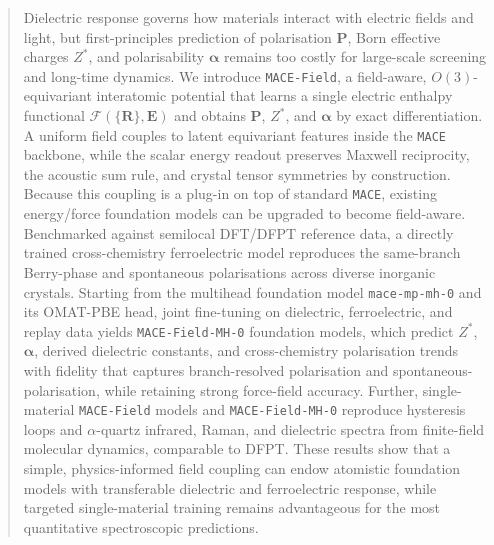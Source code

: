 \documentclass[aps,physrev,graphicx,amsmath,amssymb,
               reprint,superscriptaddress]{revtex4-2}
\begin{document}
\begin{abstract}
Dielectric response governs how materials interact with electric fields and light, but first-principles prediction of polarisation $\mathbf P$, Born effective charges $Z^*$, and polarisability $\boldsymbol\alpha$ remains too costly for large-scale screening and long-time dynamics. We introduce \texttt{MACE-Field}, a field-aware, $O(3)$-equivariant interatomic potential that learns a single electric enthalpy functional $\mathcal F(\{\mathbf R\},\mathbf E)$ and obtains $\mathbf P$, $Z^*$, and $\boldsymbol\alpha$ by exact differentiation. A uniform field couples to latent equivariant features inside the \texttt{MACE} backbone, while the scalar energy readout preserves Maxwell reciprocity, the acoustic sum rule, and crystal tensor symmetries by construction. Because this coupling is a plug-in on top of standard \texttt{MACE}, existing energy/force foundation models can be upgraded to become field-aware. Benchmarked against semilocal DFT/DFPT reference data, a directly trained cross-chemistry ferroelectric model reproduces the same-branch Berry-phase and spontaneous polarisations across diverse inorganic crystals. Starting from the multihead foundation model \texttt{mace-mp-mh-0} and its OMAT-PBE head, joint fine-tuning on dielectric, ferroelectric, and replay data yields \texttt{MACE-Field-MH-0} foundation models, which predict $Z^*$, $\boldsymbol\alpha$, derived dielectric constants, and cross-chemistry polarisation trends with fidelity that captures branch-resolved polarisation and spontaneous-polarisation, while retaining strong force-field accuracy. Further, single-material \texttt{MACE-Field} models and \texttt{MACE-Field-MH-0} reproduce  hysteresis loops and $\alpha$-quartz infrared, Raman, and dielectric spectra from finite-field molecular dynamics, comparable to DFPT. These results show that a simple, physics-informed field coupling can endow atomistic foundation models with transferable dielectric and ferroelectric response, while targeted single-material training remains advantageous for the most quantitative spectroscopic predictions.
\end{abstract}



\maketitle 
\end{document}
